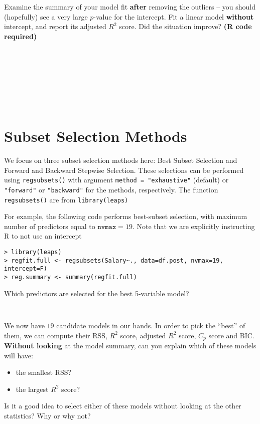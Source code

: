 \documentclass{article}
\begin{document}
Examine the summary of your model fit \textbf{after} removing the outliers --
you should (hopefully) see a very large $p$-value for the intercept. Fit a
linear model \textbf{without} intercept, and report its adjusted $R^2$ score.
Did the situation improve? \textbf{(R code required)}

\begin{Verbatim}[frame=single]








\end{Verbatim}
\section{Subset Selection Methods}
We focus on three subset selection methods here: Best Subset Selection and Forward and Backward Stepwise Selection. These selections can be performed using \texttt{regsubsets()} with argument \texttt{method = "exhaustive"} (default) or \texttt{"forward"} or \texttt{"backward"} for the methods, respectively. The function \texttt{regsubsets()} are from \texttt{library(leaps)}


For example, the following code performs best-subset selection, with maximum
number of predictors equal to $\texttt{nvmax} = 19$. Note that we are explicitly
instructing R to not use an intercept

\begin{Verbatim}[frame=single]
> library(leaps)
> regfit.full <- regsubsets(Salary~., data=df.post, nvmax=19, intercept=F)
> reg.summary <- summary(regfit.full)
\end{Verbatim}

Which predictors are selected for the best 5-variable model?
\begin{Verbatim}[frame=single]


\end{Verbatim}
We now have $19$ candidate models in our hands. In order to pick the ``best''
of them, we can compute their RSS, $R^2$ score, adjusted $R^2$ score, $C_p$
score and BIC. \textbf{Without looking} at the model summary, can you explain
which of these models will have:
\begin{itemize}
\item the smallest RSS?
\item the largest $R^2$ score?
\end{itemize}
Is it a good idea to select either of these models without looking at the other
statistics? Why or why not?
\end{document}

